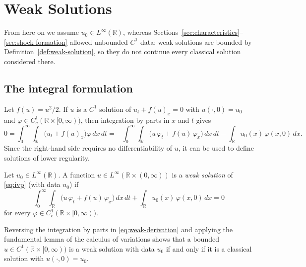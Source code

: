 
\section{Weak Solutions}
\label{sec:weak-solutions}

From here on we assume $u_0\in L^\infty(\mathbb{R})$, whereas Sections~\ref{sec:characteristics}--\ref{sec:shock-formation}
allowed unbounded $C^1$ data; weak solutions are bounded by
Definition~\ref{def:weak-solution}, so they do not continue every classical
solution considered there.

\subsection{The integral formulation}
\label{subsec:integral-form}

Let $f(u)=u^2/2$. If $u$ is a $C^1$ solution of $u_t + f(u)_x = 0$ with
$u(\cdot,0)=u_0$ and $\varphi \in C_c^1(\mathbb{R} \times [0,\infty))$, then
integration by parts in $x$ and $t$ gives
\begin{equation}
  \label{eq:weak-derivation}
  0 = \int_0^\infty\!\!\int_{\mathbb{R}} \big(u_t + f(u)_x\big)\varphi\, dx\, dt
  = -\int_0^\infty\!\!\int_{\mathbb{R}} \big(u\,\varphi_t + f(u)\,\varphi_x\big)\, dx\, dt
  - \int_{\mathbb{R}} u_0(x)\, \varphi(x,0)\, dx .
\end{equation}
Since the right-hand side requires no differentiability of $u$, it can be used to define solutions of lower regularity.

\begin{definition}
\label{def:weak-solution}
Let $u_0\in L^\infty(\mathbb{R})$. A function $u \in
L^\infty(\mathbb{R}\times(0,\infty))$ is a \emph{weak solution} of
\eqref{eq:ivp} (with data $u_0$) if
\begin{equation}
  \label{eq:weak-formulation}
  \int_0^\infty\!\!\int_{\mathbb{R}} \big(u\,\varphi_t + f(u)\,\varphi_x\big)\, dx\, dt
  + \int_{\mathbb{R}} u_0(x)\, \varphi(x,0)\, dx = 0
\end{equation}
for every $\varphi \in C_c^1(\mathbb{R}\times[0,\infty))$.
\end{definition}

Reversing the integration by parts in \eqref{eq:weak-derivation} and applying
the fundamental lemma of the calculus of variations shows that a bounded
$u\in C^1(\mathbb{R}\times[0,\infty))$ is a weak solution with data $u_0$ if and
only if it is a classical solution with $u(\cdot,0)=u_0$.

